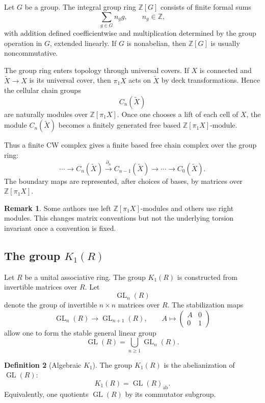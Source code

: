 \documentclass[11pt,a4paper]{article}
\newcommand{\GL}{\operatorname{GL}}
\newcommand{\ab}{\operatorname{ab}}
\newcommand{\ZZ}{\mathbb{Z}}
\theoremstyle{definition}
\newtheorem{definition}{Definition}[section]
\newtheorem{remark}[definition]{Remark}
\theoremstyle{plain}
\theoremstyle{remark}
\begin{document}
Let \(G\) be a group. The integral group ring \(\ZZ[G]\) consists of finite formal sums
\[
  \sum_{g\in G} n_g g,\qquad n_g\in\ZZ,
\]
with addition defined coefficientwise and multiplication determined by the group operation in \(G\), extended linearly. If \(G\) is nonabelian, then \(\ZZ[G]\) is usually noncommutative.

The group ring enters topology through universal covers. If \(X\) is connected and \(\widetilde X\to X\) is its universal cover, then \(\pi_1X\) acts on \(\widetilde X\) by deck transformations. Hence the cellular chain groups
\[
  C_n(\widetilde X)
\]
are naturally modules over \(\ZZ[\pi_1X]\). Once one chooses a lift of each cell of \(X\), the module \(C_n(\widetilde X)\) becomes a finitely generated free based \(\ZZ[\pi_1X]\)-module.

Thus a finite CW complex gives a finite based free chain complex over the group ring:
\[
  \cdots\longrightarrow C_n(\widetilde X)
  \xrightarrow{\partial_n} C_{n-1}(\widetilde X)
  \longrightarrow\cdots\longrightarrow C_0(\widetilde X).
\]
The boundary maps are represented, after choices of bases, by matrices over \(\ZZ[\pi_1X]\).

\begin{remark}
Some authors use left \(\ZZ[\pi_1X]\)-modules and others use right modules. This changes matrix conventions but not the underlying torsion invariant once a convention is fixed.
\end{remark}

\subsection{The group \texorpdfstring{\(K_1(R)\)}{K1(R)}}

Let \(R\) be a unital associative ring. The group \(K_1(R)\) is constructed from invertible matrices over \(R\). Let
\[
  \GL_n(R)
\]
denote the group of invertible \(n\times n\) matrices over \(R\). The stabilization maps
\[
  \GL_n(R)\longrightarrow \GL_{n+1}(R),
  \qquad
  A\longmapsto
  \begin{pmatrix}
    A&0\\
    0&1
  \end{pmatrix}
\]
allow one to form the stable general linear group
\[
  \GL(R)=\bigcup_{n\ge 1}\GL_n(R).
\]

\begin{definition}[Algebraic \(K_1\)]
The group \(K_1(R)\) is the abelianization of \(\GL(R)\):
\[
  K_1(R)=\GL(R)_{\ab}.
\]
Equivalently, one quotients \(\GL(R)\) by its commutator subgroup.
\end{definition}
\end{document}
